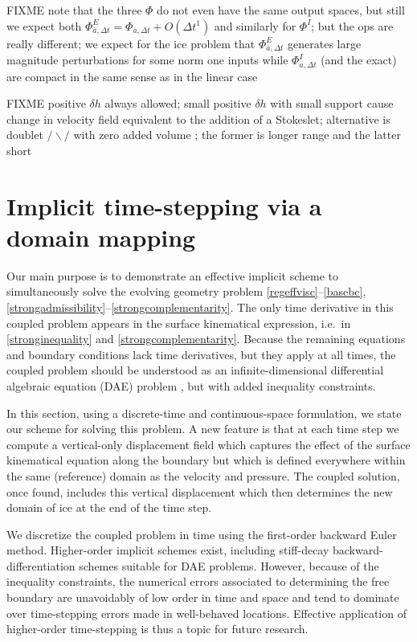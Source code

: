 \documentclass[letterpaper,final,12pt,reqno]{amsart}
\begin{document}
FIXME note that the three $\Phi$ do not even have the same output spaces, but still we expect both $\Phi^E_{\bar a,\Delta t} = \Phi_{\bar a,\Delta t} + O(\Delta t^1)$ and similarly for $\Phi^I$; but the ops are really different;  we expect for the ice problem that $\Phi^E_{\bar a,\Delta t}$ generates large magnitude perturbations for some norm one inputs while $\Phi^I_{\bar a,\Delta t}$ (and the exact) are compact in the same sense as in the linear case

FIXME positive $\delta h$ always allowed; small positive $\delta h$ with small support cause change in velocity field equivalent to the addition of a Stokeslet; alternative is doublet $/\backslash/$ with zero added volume \cite{ChwangWu1975}; the former is longer range and the latter short


\section{Implicit time-stepping via a domain mapping} \label{sec:implicitstep}

Our main purpose is to demonstrate an effective implicit scheme to simultaneously solve the evolving geometry problem \eqref{regeffvisc}--\eqref{basebc}, \eqref{strongadmissibility}--\eqref{strongcomplementarity}.  The only time derivative in this coupled problem appears in the surface kinematical expression, i.e.~in \eqref{stronginequality} and \eqref{strongcomplementarity}.  Because the remaining equations and boundary conditions lack time derivatives, but they apply at all times, the coupled problem should be understood as an infinite-dimensional differential algebraic equation (DAE) problem \cite{AscherPetzold1998}, but with added inequality constraints.

In this section, using a discrete-time and continuous-space formulation, we state our scheme for solving this problem.  A new feature is that at each time step we compute a vertical-only displacement field which captures the effect of the surface kinematical equation along the boundary but which is defined everywhere within the same (reference) domain as the velocity and pressure.  The coupled solution, once found, includes this vertical displacement which then determines the new domain of ice at the end of the time step.

We discretize the coupled problem in time using the first-order backward Euler method.  Higher-order implicit schemes exist, including stiff-decay backward-differentiation schemes \cite{AscherPetzold1998,Bueler2021} suitable for DAE problems.  However, because of the inequality constraints, the numerical errors associated to determining the free boundary are unavoidably of low order in time and space \cite{Bueler2020} and tend to dominate over time-stepping errors made in well-behaved locations.  Effective application of higher-order time-stepping is thus a topic for future research.
\end{document}
